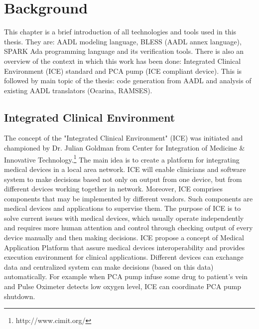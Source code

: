 
\cleardoublepage


\chapter{Background}
\label{background}

This chapter is a brief introduction of all technologies and tools used in this thesis. They are: AADL modeling language, BLESS (AADL annex language), SPARK Ada programming language and its verification tools. There is also an overview of the context in which this work has been done: Integrated Clinical Environment (ICE) standard and PCA pump (ICE compliant device). This is followed by main topic of the thesis: code generation from AADL and analysis of existing AADL translators (Ocarina, RAMSES).



\section{Integrated Clinical Environment}
\label{background:ice}

The concept of the "Integrated Clinical Environment" (ICE) was initiated and championed by Dr. Julian Goldman from Center for Integration of Medicine \& Innovative Technology.\footnote{http://www.cimit.org/} The main idea is to create a platform for integrating medical devices in a local area network. ICE will enable clinicians and software system to make decisions based not only on output from one device, but from different devices working together in network. Moreover, ICE comprises components that may be implemented by different vendors. Such components are medical devices and applications to supervise them. The purpose of ICE is to solve current issues with medical devices, which usually operate independently and requires more human attention and control through checking output of every device manually and then making decisions. ICE propose a concept of Medical Application Platform \cite{MedicalApplicationPlatforms:Paper} that assure medical devices interoperability and provides execution environment for clinical applications. Different devices can exchange data and centralized system can make decisions (based on this data) automatically. For example when PCA pump infuse some drug to patient's vein and Pulse Oximeter detects low oxygen level, ICE can coordinate PCA pump shutdown. 

